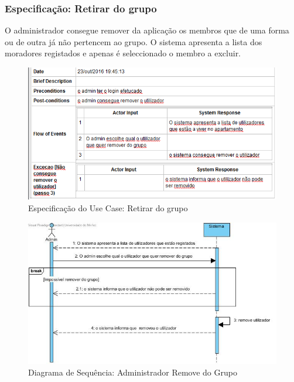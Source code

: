 \subsubsection{Especificação: Retirar do grupo }
O administrador consegue remover da aplicação os membros que de uma forma ou de   outra já não pertencem ao grupo.  O sistema apresenta a lista dos moradores registados e apenas é seleccionado o membro a excluir. 

\begin{figure}[htb!]
	\centering
	\includegraphics[scale=0.7]{imagens/Especificacoes/retirardogrupo}  
	\caption{Especificação do Use Case: Retirar do grupo}  
\end{figure}

\begin{figure}[htb!]
	\centering
	\includegraphics[scale=0.5]{imagens/DiagramaSeq/RetirarDoGrupo}  
	\caption{Diagrama de Sequência: Administrador Remove do Grupo}  
\end{figure}

